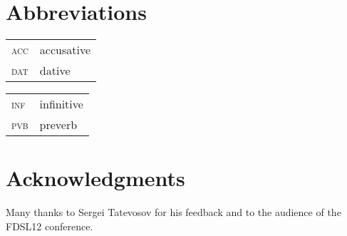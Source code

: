 \documentclass[output=paper]{langscibook}
\begin{document}
\section*{Abbreviations}

\begin{tabularx}{.45\textwidth}{lX}
\textsc{acc}&accusative\\
\textsc{dat}&dative\\
\end{tabularx}
\begin{tabularx}{.45\textwidth}{lX}
\textsc{inf}&infinitive\\
\textsc{pvb}&preverb\\
\end{tabularx}

\section*{Acknowledgments}
Many thanks to Sergei Tatevosov for his feedback and to the audience of the FDSL12 conference.

\sloppy
\printbibliography[heading=subbibliography,notkeyword=this]
\end{document}
